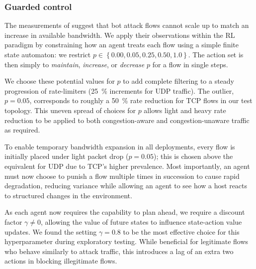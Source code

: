 \documentclass[10pt, times, conference, letterpaper]{IEEEtran}
\begin{document}
\subsubsection{Guarded control}
The measurements of \textcite{DBLP:conf/ndss/KangGS16} suggest that bot attack flows cannot scale up to match an increase in available bandwidth.
We apply their observations within the RL paradigm by constraining how an agent treats each flow using a simple finite state automaton: we restrict $p \in \left\{ 0.00, 0.05, 0.25, 0.50, 1.0 \right\}$.
The action set is then simply to \emph{maintain}, \emph{increase}, or \emph{decrease} $p$ for a flow in single steps.

We choose these potential values for $p$ to add complete filtering to a steady progression of rate-limiters (\SI{25}{\percent} increments for UDP traffic).
The outlier, $p=0.05$, corresponds to roughly a \SI{50}{\percent} rate reduction for TCP flows in our test topology.
This uneven spread of choices for $p$ allows light and heavy rate reduction to be applied to both congestion-aware and congestion-unaware traffic as required.

To enable temporary bandwidth expansion in all deployments, every flow is initially placed under light packet drop ($p=0.05$); this is chosen above the equivalent for UDP due to TCP's higher prevalence.
Most importantly, an agent must now choose to punish a flow multiple times in succession to cause rapid degradation, reducing variance while allowing an agent to see how a host reacts to structured changes in the environment.

As each agent now requires the capability to plan ahead, we require a discount factor $\gamma \ne 0$, allowing the value of future states to influence state-action value updates.
We found the setting $\gamma = 0.8$ to be the most effective choice for this hyperparameter during exploratory testing.
While beneficial for legitimate flows who behave similarly to attack traffic, this introduces a lag of an extra two actions in blocking illegitimate flows.
\end{document}
